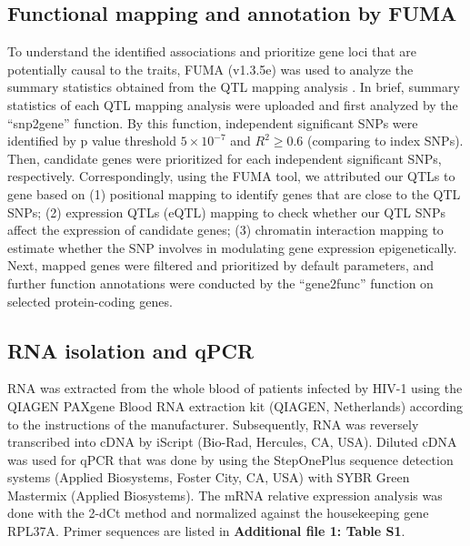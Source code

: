 \documentclass{book}
\begin{document}
\begin{refsection}
\subsection*{Functional mapping and annotation by FUMA}
To understand the identified associations and prioritize gene loci that are potentially causal to the traits, FUMA (v1.3.5e) was used to analyze the summary statistics obtained from the QTL mapping analysis \cite{Watanabe2017Functional}.
In brief, summary statistics of each QTL mapping analysis were uploaded and first analyzed by the ``snp2gene'' function.
By this function, independent significant SNPs were identified by p value threshold $5 \times 10^{-7}$ and $R^2 \ge 0.6$ (comparing to index SNPs).
Then, candidate genes were prioritized for each independent significant SNPs, respectively.
Correspondingly, using the FUMA tool, we attributed our QTLs to gene based on (1) positional mapping to identify genes that are close to the QTL SNPs; (2) expression QTLs (eQTL) mapping to check whether our QTL SNPs affect the expression of candidate genes; (3) chromatin interaction mapping to estimate whether the SNP involves in modulating gene expression epigenetically.
Next, mapped genes were filtered and prioritized by default parameters, and further function annotations were conducted by the ``gene2func'' function on selected protein-coding genes.

\subsection*{RNA isolation and qPCR}
RNA was extracted from the whole blood of patients infected by HIV-1 using the QIAGEN PAXgene Blood RNA extraction kit (QIAGEN, Netherlands) according to the instructions of the manufacturer.
Subsequently, RNA was reversely transcribed into cDNA by iScript (Bio-Rad, Hercules, CA, USA).
Diluted cDNA was used for qPCR that was done by using the StepOnePlus sequence detection systems (Applied Biosystems, Foster City, CA, USA) with SYBR Green Mastermix (Applied Biosystems).
The mRNA relative expression analysis was done with the 2-dCt method and normalized against the housekeeping gene RPL37A.
Primer sequences are listed in \textbf{Additional file 1: Table S1}.


\end{refsection}
\end{document}
